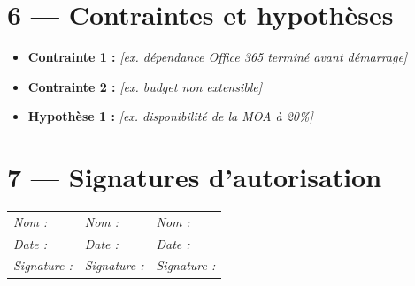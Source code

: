 \documentclass[11pt,a4paper,oneside]{report}
\begin{document}
\section*{6 --- Contraintes et hypothèses}

\begin{itemize}
  \item \textbf{Contrainte 1 :} \textit{[ex. dépendance Office 365 terminé avant démarrage]}
  \item \textbf{Contrainte 2 :} \textit{[ex. budget non extensible]}
  \item \textbf{Hypothèse 1 :} \textit{[ex. disponibilité de la MOA à 20\%]}
\end{itemize}

\section*{7 --- Signatures d'autorisation}

\vspace{1cm}
\renewcommand{\arraystretch}{2}
\begin{tabularx}{\textwidth}{Y Y Y}
\toprule
{} &  &  \\
\midrule
\textit{Nom :} & \textit{Nom :} & \textit{Nom :} \\
\textit{Date :} & \textit{Date :} & \textit{Date :} \\
\textit{Signature :} & \textit{Signature :} & \textit{Signature :} \\
\bottomrule
\end{tabularx}
\end{document}
